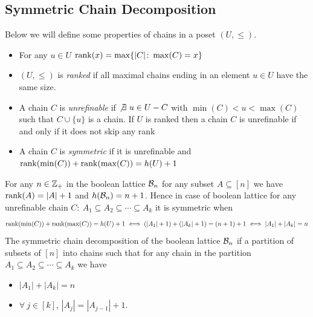 \subsection{Symmetric Chain Decomposition}
Below we will define some properties of chains in a poset $(U,\leq)$.\begin{itemize}[label=$\bullet$]
	\item For any $u\in U$ $\operatorname{rank}(x)=\max\limits\{|C|\colon \max(C)=x\}$
	\item $(U,\leq)$ is \textit{ranked} if  all maximal chains ending in an element $u\in U$ have the same size.
	\item A chain $C$ is \textit{unrefinable} if $\not\exists\ u\in U-C$ with $\min(C)<u<\max(C)$ such that $C\cup \{u\}$ is a chain. If $U$ is ranked then a chain $C$ is unrefinable if and only if it does not skip any rank
	\item A chain $C$ is \textit{symmetric} if it is unrefinable and $\operatorname{rank}(\min(C))+\operatorname{rank}(\max(C))=h(U)+1$
\end{itemize}

For any $n\in \mathbb{Z}_+$  in the boolean lattice $\mathcal{B}_n$ for any subset $A\subseteq [n]$ we have $\operatorname{rank}(A)=|A|+1$ and $h(\mathcal{B}_n)=n+1$. Hence in case of boolean lattice for any unrefinable chain $C:\ A_1\subseteq A_2\subseteq \cdots\subseteq A_k$ it is symmetric when $$\operatorname{rank}(\min(C))+\operatorname{rank}(\max(C))=h(U)+1\iff (|A_1|+1)+(|A_k|+1)=(n+1)+1\iff |A_1|+|A_k|=n$$The symmetric chain decomposition of the boolean lattice $\mathcal{B}_n$ if a partition of subsets of $[n]$ into chains such that for any chain in the partition $A_1\subseteq A_2\subseteq\cdots \subseteq A_k$ we have \begin{itemize}[label=$\bullet$]
	\item $|A_1|+|A_k|=n$
	\item $\forall\ j\in[k]$, $|A_j|=|A_{j-1}|+1$.
\end{itemize}

\vspace*{5mm}

